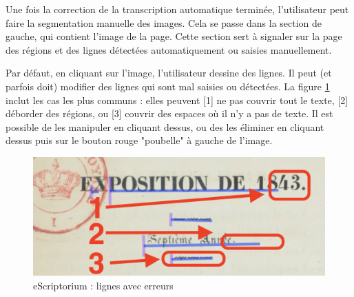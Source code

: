 \documentclass[a4paper,12pt,twoside]{book}
\begin{document}
Une fois la correction de la transcription automatique terminée, l'utilisateur peut faire la segmentation manuelle des images. Cela se passe dans la section de gauche, qui contient l'image de la page. Cette section sert à signaler sur la page des régions et des lignes détectées automatiquement ou saisies manuellement. 

Par défaut, en cliquant sur l'image, l'utilisateur dessine des lignes. Il peut (et parfois doit) modifier des lignes qui sont mal saisies ou détectées. La figure \ref{lignesproblemes} inclut les cas les plus communs : elles peuvent [1] ne pas couvrir tout le texte, [2] déborder des régions, ou [3] couvrir des espaces où il n'y a pas de texte. Il est possible de les manipuler en cliquant dessus, ou des les éliminer en cliquant dessus puis sur le bouton rouge "poubelle" à gauche de l'image.

\begin{figure}[ht]
	\centering
	\includegraphics[scale=0.5]{lignes_eScriptorium.png}		
	\caption{eScriptorium : lignes avec erreurs}
	\label{lignesproblemes}
\end{figure}
\end{document}
